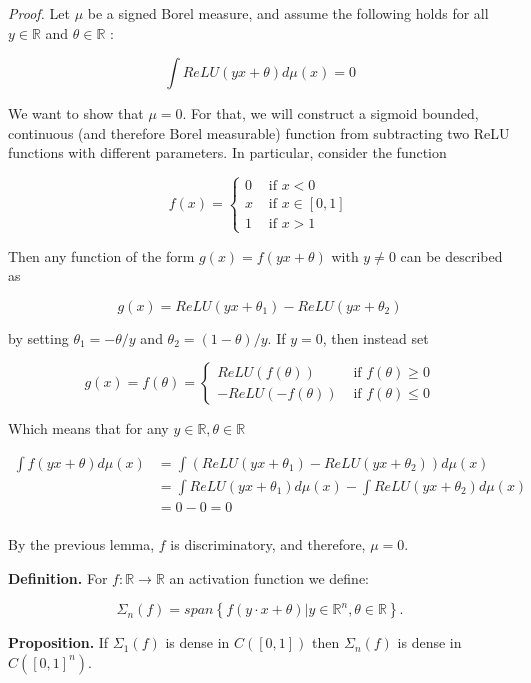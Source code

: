 \textit{Proof.} Let $\mu$ be a signed Borel measure, and assume the following holds for all $y \in \mathbb{R}$ and $\theta \in \mathbb{R}$ :

$$
\int ReLU(y x+\theta) d \mu(x)=0
$$

We want to show that $\mu=0$. For that, we will construct a sigmoid bounded, continuous (and therefore Borel measurable) function from subtracting two ReLU functions with different parameters. In particular, consider the function

$$
f(x)=\left\{\begin{array}{ll}
0 & \text { if } x<0 \\
x & \text { if } x \in[0,1] \\
1 & \text { if } x>1
\end{array}\right.
$$

Then any function of the form $g(x)=f(y x+\theta)$ with $y \neq 0$ can be described as

$$
g(x)=ReLU\left(y x+\theta_1\right)-ReLU\left(y x+\theta_2\right)
$$

by setting $\theta_1=-\theta / y$ and $\theta_2=(1-\theta) / y$. If $y=0$, then instead set

$$
g(x)=f(\theta)=\left\{\begin{array}{ll}
ReLU(f(\theta)) & \text { if } f(\theta) \geq 0 \\
-ReLU(-f(\theta)) & \text { if } f(\theta) \leq 0
\end{array}\right.
$$

Which means that for any $y \in \mathbb{R}, \theta \in \mathbb{R}$

\[
\begin{split}
    \int f(y x+\theta) d \mu(x) &=\int\left(ReLU\left(y x+\theta_1\right)-ReLU\left(y x+\theta_2\right)\right) d \mu(x) \\
&=\int ReLU\left(y x+\theta_1\right) d \mu(x)-\int ReLU\left(y x+\theta_2\right) d \mu(x) \\
&=0-0=0 \\
\end{split}
\]

By the previous lemma, $f$ is discriminatory, and therefore, $\mu=0$.

\textbf{Definition.} For $f: \mathbb{R}\rightarrow \mathbb{R}$ an activation function we define:

$$
\Sigma_n(f)=span\left\{f(y\cdot x+ \theta)|y\in \mathbb{R}^n, \theta \in \mathbb{R}\right\}.
$$

\textbf{Proposition.} If $\Sigma_1(f)$ is dense in $C([0,1])$ then $\Sigma_n(f)$ is dense in $C([0,1]^n)$.

